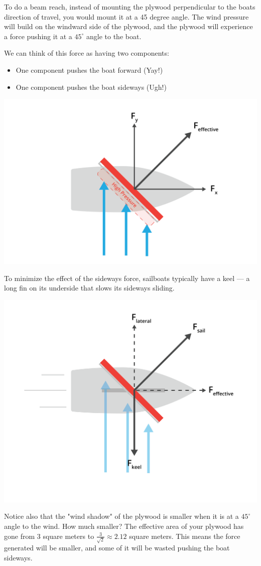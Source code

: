 To do a beam reach,  instead of mounting the plywood perpendicular to the boats direction of travel,  you would mount it at a 45 degree angle. The wind pressure will build on the windward
side of the plywood,  and the plywood will experience a force pushing it at a $45^\circ$ angle to the boat.

We can think of this force as having two components: 
\begin{itemize}
\item One component pushes the boat forward (Yay!)
\item One component pushes the boat sideways (Ugh!)
\end{itemize}
\includegraphics[width=.75\textwidth]{pressure.png}

To minimize the effect of the sideways force,  sailboats typically have  a keel --- a long fin on its underside that slows its sideways sliding.

\includegraphics[width=.75\textwidth]{pressure2.png}


Notice also that the "wind shadow" of the plywood is smaller when it is at a $45^\circ$ angle to the wind.  How much smaller?  The effective area of your plywood has 
gone from 3 square meters to $\frac{3}{\sqrt{2}} \approx 2.12$ square meters. This means the force generated will be smaller, and some of it will be wasted pushing the boat sideways.

